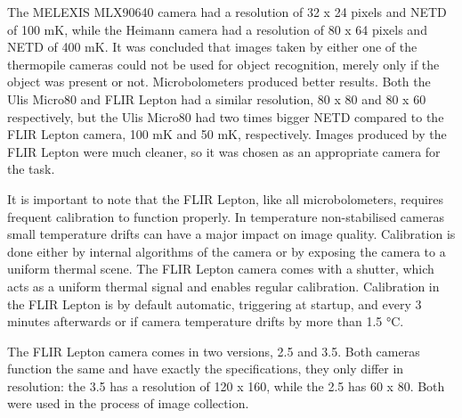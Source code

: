 The MELEXIS MLX90640 camera had a resolution of 32 x 24 pixels and NETD of 100 \si{\milli\kelvin}, while the Heimann camera had a resolution of 80 x 64 pixels and NETD of 400 \si{\milli\kelvin}.
It was concluded that images taken by either one of the thermopile cameras could not be used for object recognition, merely only if the object was present or not\cite{thermal_comparison}.
\clearpage
Microbolometers produced better results.
Both the Ulis Micro80 and FLIR Lepton had a similar resolution, 80 x 80 and 80 x 60 respectively, but the Ulis Micro80 had two times bigger NETD compared to the FLIR Lepton camera, 100 \si{\milli\kelvin} and 50 \si{\milli\kelvin}, respectively.
Images produced by the FLIR Lepton were much cleaner, so it was chosen as an appropriate camera for the task.

It is important to note that the FLIR Lepton, like all microbolometers, requires frequent calibration to function properly.
In temperature non-stabilised cameras small temperature drifts can have a major impact on image quality\cite{thermal_book}.
Calibration is done either by internal algorithms of the camera or by exposing the camera to a uniform thermal scene.
The FLIR Lepton camera comes with a shutter, which acts as a uniform thermal signal and enables regular calibration.
Calibration in the FLIR Lepton is by default automatic, triggering at startup, and every 3 minutes afterwards or if camera temperature drifts by more than 1.5 \si{\celsius}.

The FLIR Lepton camera comes in two versions, 2.5 and 3.5.
Both cameras function the same and have exactly the specifications, they only differ in resolution: the 3.5 has a resolution of 120 x 160, while the 2.5 has 60 x 80.
Both were used in the process of image collection.
